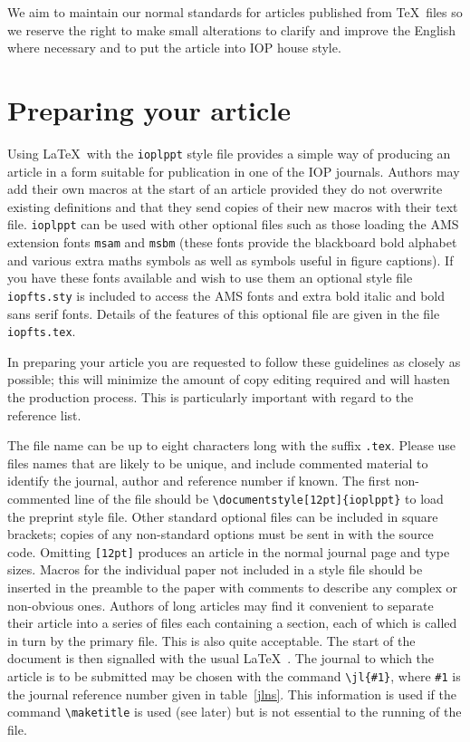 We aim to maintain our normal standards
for articles published from \TeX\ files so we reserve
the right to make small alterations  to clarify and improve the
English where necessary and to put the article into IOP house style.


\section{Preparing your article}
Using \LaTeX\ with the \verb"ioplppt" style file
provides a simple way of
producing an article in a form suitable for publication in one
of the IOP journals. Authors may add their own macros
at the start of an article
provided they do not overwrite existing definitions and
that they send copies of their new macros with their text file.
\verb"ioplppt" can be used with other optional files such
as those loading the AMS extension fonts
\verb"msam" and \verb"msbm" (these fonts provide the
blackboard bold alphabet
and various extra maths symbols as well as symbols useful in figure
captions). If you have these fonts available and wish to use
them an optional style file \verb"iopfts.sty"
is included to access the AMS fonts and extra bold italic and bold sans
serif fonts. Details of the features of this optional file are
given in the file \verb"iopfts.tex".

In preparing your article you are
requested to follow these guidelines as closely as possible; this will
minimize the amount of copy editing required and will hasten the
production process. This is particularly important with regard to the
reference list.

The file name can be up to eight characters long with the suffix \verb".tex".
Please use files names that are likely to be unique, and include
commented material to identify the journal, author and reference number if
known. The first non-commented line of the file should be
\verb"\documentstyle[12pt]{ioplppt}"  to load the preprint style
file. Other standard optional files can be included in square brackets;
copies of any non-standard options must be sent in with the source code.
Omitting \verb"[12pt]" produces an article in the normal journal
page and type
sizes. Macros for the individual paper not included in a style file
should be inserted in the preamble to the paper with comments to
describe any complex or non-obvious ones.
Authors of long articles may find it convenient to separate their article
into a series of files each containing a section, each of which is called
in turn by the primary file. This is also quite acceptable.
The start of the document is then signalled with the usual \LaTeX\
\verb"".
The
journal to which the article is to be submitted may be chosen with the
command \verb"\jl{#1}", where \verb"#1" is the journal reference number
given in
table~\ref{jlns}. This information is used if the command \verb"\maketitle"
is used (see later) but is not essential to the running of the
file.

